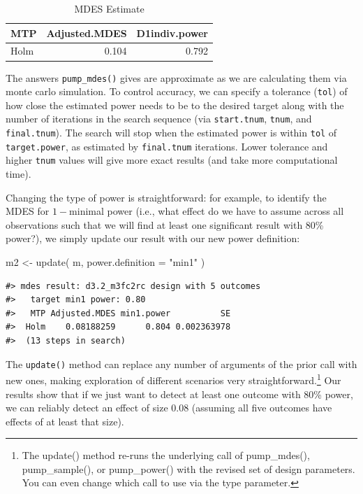 \documentclass{article}
\newenvironment{Shaded}{\begin{snugshade}}{\end{snugshade}}
\newcommand{\AttributeTok}[1]{\textcolor[rgb]{0.77,0.63,0.00}{#1}}
\newcommand{\FunctionTok}[1]{\textcolor[rgb]{0.00,0.00,0.00}{#1}}
\newcommand{\NormalTok}[1]{#1}
\newcommand{\OtherTok}[1]{\textcolor[rgb]{0.56,0.35,0.01}{#1}}
\newcommand{\StringTok}[1]{\textcolor[rgb]{0.31,0.60,0.02}{#1}}
\begin{document}
\begin{table}[h!]

\caption{\label{tab:unnamed-chunk-3}MDES Estimate}
\centering
\begin{tabular}[t]{lrr}
\toprule
MTP & Adjusted.MDES & D1indiv.power\\
\midrule
Holm & 0.104 & 0.792\\
\bottomrule
\end{tabular}
\end{table}

The answers \texttt{pump\_mdes()} gives are approximate as we are
calculating them via monte carlo simulation. To control accuracy, we can
specify a tolerance (\texttt{tol}) of how close the estimated power
needs to be to the desired target along with the number of iterations in
the search sequence (via \texttt{start.tnum}, \texttt{tnum}, and
\texttt{final.tnum}). The search will stop when the estimated power is
within \texttt{tol} of \texttt{target.power}, as estimated by
\texttt{final.tnum} iterations. Lower tolerance and higher \texttt{tnum}
values will give more exact results (and take more computational time).

Changing the type of power is straightforward: for example, to identify
the MDES for \(1-\)minimal power (i.e., what effect do we have to assume
across all observations such that we will find at least one significant
result with 80\% power?), we simply update our result with our new power
definition:

\begin{Shaded}
\begin{Highlighting}[]
\NormalTok{m2 }\OtherTok{\textless{}{-}} \FunctionTok{update}\NormalTok{( m, }\AttributeTok{power.definition =} \StringTok{"min1"}\NormalTok{ )}
\end{Highlighting}
\end{Shaded}

\begin{verbatim}
#> mdes result: d3.2_m3fc2rc design with 5 outcomes
#>   target min1 power: 0.80
#>   MTP Adjusted.MDES min1.power          SE
#>  Holm    0.08188259      0.804 0.002363978
#>  (13 steps in search)
\end{verbatim}

The \texttt{update()} method can replace any number of arguments of the
prior call with new ones, making exploration of different scenarios very
straightforward.\footnote{The update() method re-runs the underlying
  call of pump\_mdes(), pump\_sample(), or pump\_power() with the
  revised set of design parameters. You can even change which call to
  use via the type parameter.} Our results show that if we just want to
detect at least one outcome with 80\% power, we can reliably detect an
effect of size \(0.08\) (assuming all five outcomes have effects of at
least that size).
\end{document}
